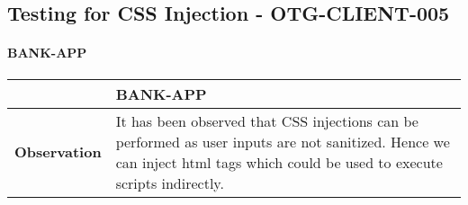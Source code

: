 \subsection{Testing for CSS Injection - OTG-CLIENT-005}

\paragraph{BANK-APP} \mbox{}
\begin{longtable*}{p{.30\textwidth} | p{.70\textwidth}}
    \hline
    & \textbf{BANK-APP} \\
    \hline
    \textbf{Observation} &
     It has been observed that CSS injections can be performed as user inputs are not sanitized. Hence we can inject html tags which could be used to execute scripts indirectly.
     

\end{longtable*}
